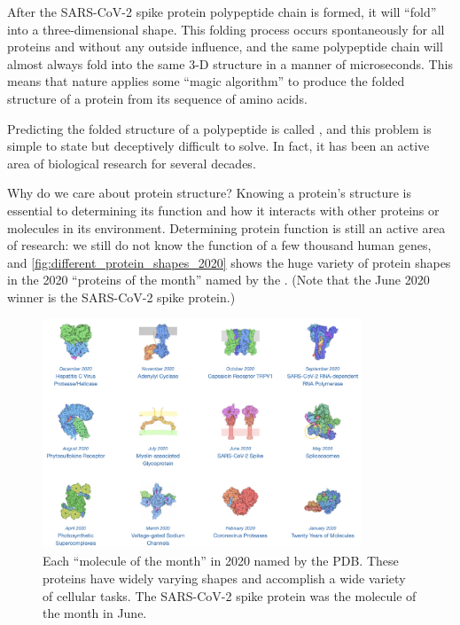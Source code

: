 After the SARS-CoV-2 spike protein polypeptide chain is formed, it will ``fold'' into a three-dimensional shape. This folding process occurs spontaneously for all proteins and without any outside influence, and the same polypeptide chain will almost always fold into the same 3-D structure in a manner of microseconds. This means that nature applies some ``magic algorithm'' to produce the folded structure of a protein from its sequence of amino acids.

Predicting the folded structure of a polypeptide is called , and this problem is simple to state but deceptively difficult to solve. In fact, it has been an active area of biological research for several decades.

Why do we care about protein structure? Knowing a protein's structure is essential to determining its function and how it interacts with other proteins or molecules in its environment. Determining protein function is still an active area of research: we still do not know the function of a few thousand human genes, and \autoref{fig:different_protein_shapes_2020} shows the huge variety of protein shapes in the 2020 ``proteins of the month'' named by the . (Note that the June 2020 winner is the SARS-CoV-2 spike protein.)

\begin{figure}[h]
	\centering
	\mySfFamily
	\includegraphics[width = 0.85\textwidth]{../images/different_protein_shapes_2020.jpg}
	\caption{Each ``molecule of the month'' in 2020 named by the PDB. These proteins have widely varying shapes and accomplish a wide variety of cellular tasks. The SARS-CoV-2 spike protein was the molecule of the month in June.}
	\label{fig:different_protein_shapes_2020}
\end{figure}

